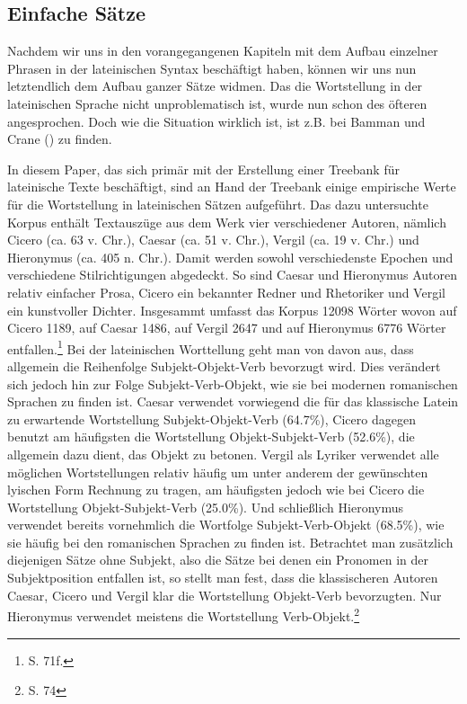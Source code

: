 \subsection{Einfache Sätze}
\label{subsec:einfachesaetze}
Nachdem wir uns in den vorangegangenen Kapiteln mit dem Aufbau einzelner Phrasen in der lateinischen Syntax beschäftigt haben, können wir uns nun letztendlich dem Aufbau ganzer Sätze widmen. Das die Wortstellung in der lateinischen Sprache nicht unproblematisch ist, wurde nun schon des öfteren angesprochen. Doch wie die Situation wirklich ist, ist z.B. bei Bamman und Crane (\cite{BAMMAN2006}) zu finden. \par 
In diesem Paper, das sich primär mit der Erstellung einer Treebank für lateinische Texte beschäftigt, sind an Hand der Treebank einige empirische Werte für die Wortstellung in lateinischen Sätzen aufgeführt. Das dazu untersuchte Korpus enthält Textauszüge aus dem Werk vier verschiedener Autoren, nämlich Cicero (ca. 63 v. Chr.), Caesar (ca. 51 v. Chr.), Vergil (ca. 19 v. Chr.) und Hieronymus (ca. 405 n. Chr.). Damit werden sowohl verschiedenste Epochen und verschiedene Stilrichtigungen abgedeckt. So sind Caesar und Hieronymus Autoren relativ einfacher Prosa, Cicero ein bekannter Redner und Rhetoriker und Vergil ein kunstvoller Dichter. Insgesammt umfasst das Korpus 12098 Wörter wovon auf Cicero 1189, auf Caesar 1486, auf Vergil 2647 und auf Hieronymus 6776 Wörter entfallen.\footnote{\cite{BAMMAN2006} S. 71f.} 
Bei der lateinischen Worttellung geht man von davon aus, dass allgemein die Reihenfolge Subjekt-Objekt-Verb bevorzugt wird. Dies verändert sich jedoch hin zur Folge Subjekt-Verb-Objekt, wie sie bei modernen romanischen Sprachen zu finden ist. Caesar verwendet vorwiegend die für das klassische Latein zu erwartende Wortstellung Subjekt-Objekt-Verb (64.7\%), Cicero dagegen benutzt am häufigsten die Wortstellung Objekt-Subjekt-Verb (52.6\%), die allgemein dazu dient, das Objekt zu betonen. Vergil als Lyriker verwendet alle möglichen Wortstellungen relativ häufig um unter anderem der gewünschten lyischen Form Rechnung zu tragen, am häufigsten jedoch wie bei Cicero die Wortstellung Objekt-Subjekt-Verb (25.0\%). Und schließlich Hieronymus verwendet bereits vornehmlich die Wortfolge Subjekt-Verb-Objekt (68.5\%), wie sie häufig bei den romanischen Sprachen zu finden ist. Betrachtet man zusätzlich diejenigen Sätze ohne Subjekt, also die Sätze bei denen ein Pronomen in der Subjektposition entfallen ist, so stellt man fest, dass die klassischeren Autoren Caesar, Cicero und Vergil klar die Wortstellung  Objekt-Verb bevorzugten. Nur Hieronymus verwendet meistens die Wortstellung Verb-Objekt.\footnote{\cite{BAMMAN2006} S. 74} \par
